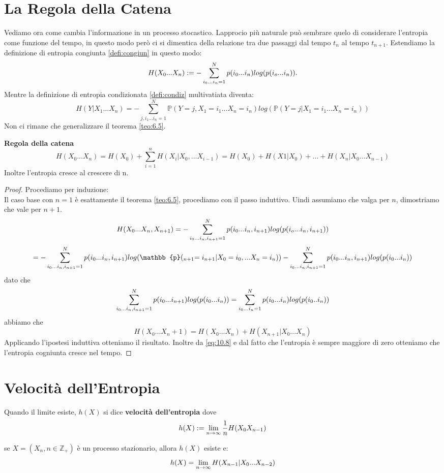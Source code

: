 \section{La Regola della Catena}
\label{sec:chainRule}
Vediamo ora come cambia l'informazione in un processo stocastico. Lapprocio più naturale può sembrare quelo di considerare l'entropia come funzione del tempo, in questo modo però ci si dimentica della relazione tra due passaggi dal tempo $t_n$ al tempo $t_{n+1}$. Estendiamo la definizione di entropia congiunta \ref{defi:congiun} in questo modo:
\begin{equation}
H(X_0...X_n):=- \sum_{i_0...i_n=1}^N p(i_0...i_n)log(p(i_o...i_n)).
\end{equation}
Mentre la definizione di entropia condizionata \ref{defi:condiz} multivatiata diventa:
\begin{equation}
H(Y|X_1...X_n)=-\sum_{j,i_1...i_n=1}^N \mathbb{P}(Y=j,X_1=i_1...X_n=i_n) log(\mathbb{P}(Y=j|X_1=i_1...X_n=i_n))
\end{equation}
Non ci rimane che generalizzare il teorema \ref{teo:6.5}.
\begin{teo}\textbf{Regola della catena}
\begin{equation}
H(X_0...X_n)=H(X_0)+\sum_{i=1}^n  H(X_i|X_0,...X_{i-1})=H(X_0)+H(X1|X_0)+...+H(X_n|X_0...X_{n-1})
\end{equation}
Inoltre l'entropia cresce al crescere di n.
\end{teo}
\begin{proof}
Procediamo per induzione:\\
Il caso base con $n=1$ è esattamente il teorema \ref{teo:6.5}, procediamo con il passo induttivo. Uindi assumiamo che valga per $n$, dimostriamo che vale per $n+1$.
$$H(X_0...X_n, X_{n+1})=- \sum_{i_0...i_n,i_{n+1}=1}^N p(i_0...i_n,i_{n+1})log(p(i_o...i_n,i_{n+1}))$$
$$= - \sumaa p(i_0...i_n,i_{n+1})log(\mathbb{p}(_{n+1}=i_{n+1}|X_0=i_0,...X_n=i_n))-\sumaa p(i_0...i_n,i_{n+1})log(p(i_0...i_n))$$
dato che 
$$\sum_{i_0...i_n,i_{n+1}=1}^N p(i_0...i_{n+1})log(p(i_0...i_n))=\sum_{i_0...i_n=1}^N p(i_0...i_{n})log(p(i_0..i_n))$$
abbiamo che
\begin{equation}\label{eq:10.8}
H(X_0...X_n+1)=H(X_0...X_n)+H(X_{n+1}|X_0...X_n)
\end{equation}
Applicando l'ipostesi induttiva otteniamo il risultato.
Inoltre da \ref{eq:10.8} e dal fatto che l'entropia è sempre maggiore di zero otteniamo che l'entropia cogniunta cresce nel tempo.
\end{proof}


\section{Velocità dell'Entropia}
\label{sec:EntropyRate}
\begin{defi}
Quando il limite esiste, $h(X)$ si dice \textbf{velocità dell'entropia} dove
$$h(X):=\lim_{n\to \infty}\frac{1}{n}H(X_0X_{n-1})$$
\end{defi}
\begin{teo}
se $X=(X_n,n\in \mathbb{Z}_+)$ è un processo stazionario, allora $h(X)$ esiste e:
\begin{equation}
h(X)=\lim_{n\to \infty} H(X_{n-1}|X_0...X_{n-2})
\end{equation}
\end{teo}




